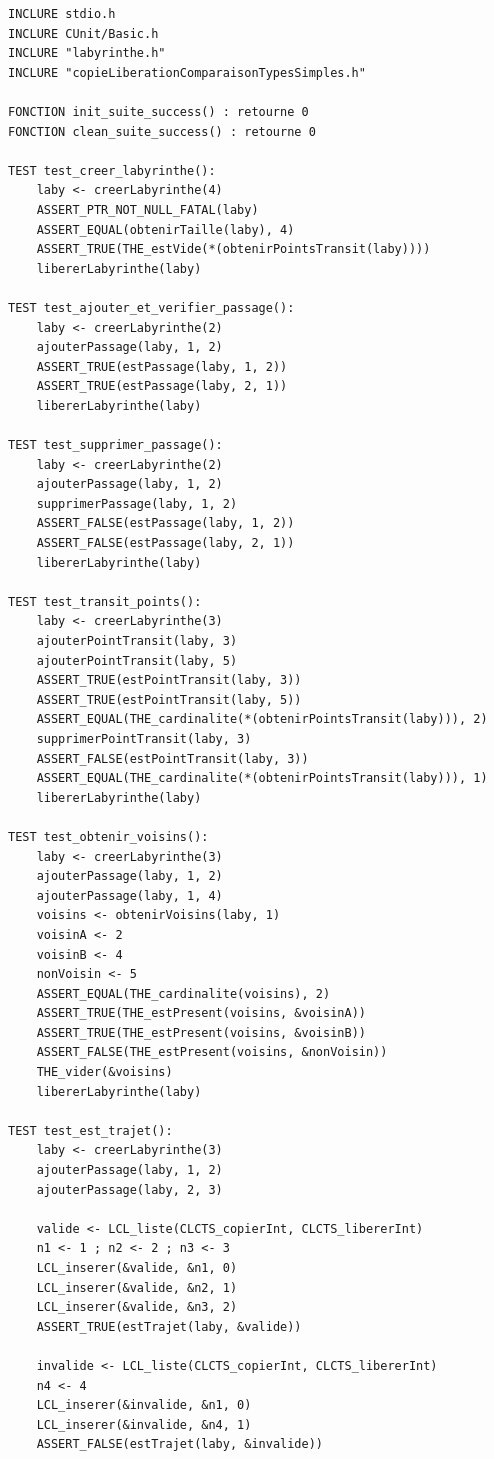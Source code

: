 \begin{verbatim}
INCLURE stdio.h
INCLURE CUnit/Basic.h
INCLURE "labyrinthe.h"
INCLURE "copieLiberationComparaisonTypesSimples.h"

FONCTION init_suite_success() : retourne 0
FONCTION clean_suite_success() : retourne 0

TEST test_creer_labyrinthe():
    laby <- creerLabyrinthe(4)
    ASSERT_PTR_NOT_NULL_FATAL(laby)
    ASSERT_EQUAL(obtenirTaille(laby), 4)
    ASSERT_TRUE(THE_estVide(*(obtenirPointsTransit(laby))))
    libererLabyrinthe(laby)

TEST test_ajouter_et_verifier_passage():
    laby <- creerLabyrinthe(2)
    ajouterPassage(laby, 1, 2)
    ASSERT_TRUE(estPassage(laby, 1, 2))
    ASSERT_TRUE(estPassage(laby, 2, 1))
    libererLabyrinthe(laby)

TEST test_supprimer_passage():
    laby <- creerLabyrinthe(2)
    ajouterPassage(laby, 1, 2)
    supprimerPassage(laby, 1, 2)
    ASSERT_FALSE(estPassage(laby, 1, 2))
    ASSERT_FALSE(estPassage(laby, 2, 1))
    libererLabyrinthe(laby)

TEST test_transit_points():
    laby <- creerLabyrinthe(3)
    ajouterPointTransit(laby, 3)
    ajouterPointTransit(laby, 5)
    ASSERT_TRUE(estPointTransit(laby, 3))
    ASSERT_TRUE(estPointTransit(laby, 5))
    ASSERT_EQUAL(THE_cardinalite(*(obtenirPointsTransit(laby))), 2)
    supprimerPointTransit(laby, 3)
    ASSERT_FALSE(estPointTransit(laby, 3))
    ASSERT_EQUAL(THE_cardinalite(*(obtenirPointsTransit(laby))), 1)
    libererLabyrinthe(laby)

TEST test_obtenir_voisins():
    laby <- creerLabyrinthe(3)
    ajouterPassage(laby, 1, 2)
    ajouterPassage(laby, 1, 4)
    voisins <- obtenirVoisins(laby, 1)
    voisinA <- 2
    voisinB <- 4
    nonVoisin <- 5
    ASSERT_EQUAL(THE_cardinalite(voisins), 2)
    ASSERT_TRUE(THE_estPresent(voisins, &voisinA))
    ASSERT_TRUE(THE_estPresent(voisins, &voisinB))
    ASSERT_FALSE(THE_estPresent(voisins, &nonVoisin))
    THE_vider(&voisins)
    libererLabyrinthe(laby)

TEST test_est_trajet():
    laby <- creerLabyrinthe(3)
    ajouterPassage(laby, 1, 2)
    ajouterPassage(laby, 2, 3)

    valide <- LCL_liste(CLCTS_copierInt, CLCTS_libererInt)
    n1 <- 1 ; n2 <- 2 ; n3 <- 3
    LCL_inserer(&valide, &n1, 0)
    LCL_inserer(&valide, &n2, 1)
    LCL_inserer(&valide, &n3, 2)
    ASSERT_TRUE(estTrajet(laby, &valide))

    invalide <- LCL_liste(CLCTS_copierInt, CLCTS_libererInt)
    n4 <- 4
    LCL_inserer(&invalide, &n1, 0)
    LCL_inserer(&invalide, &n4, 1)
    ASSERT_FALSE(estTrajet(laby, &invalide))


\end{verbatim}
